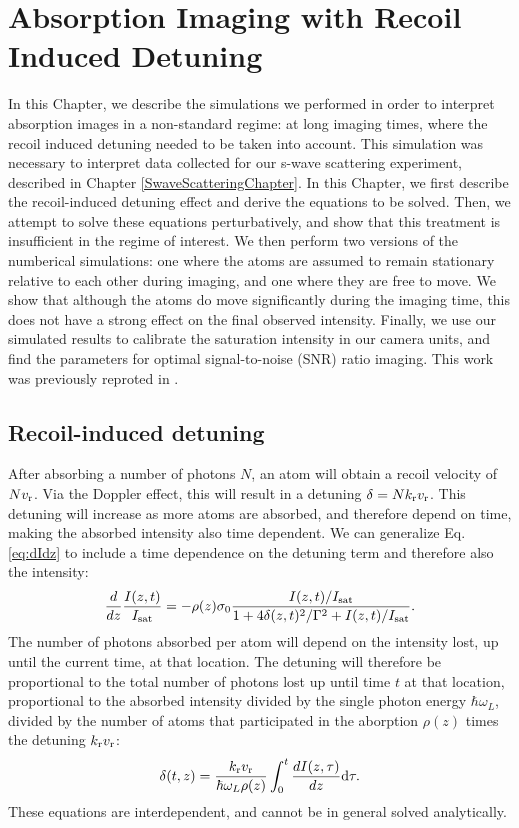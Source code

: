 \renewcommand{\thechapter}{4}

\chapter{Absorption Imaging with Recoil Induced Detuning}\label{AbsorptionImagingChapter}

In this Chapter, we describe the simulations we performed in order to interpret absorption images in a non-standard regime: at long imaging times, where the recoil induced detuning needed to be taken into account. This simulation was necessary to interpret data collected for our s-wave scattering experiment, described in Chapter \ref{SwaveScatteringChapter}. In this Chapter, we first describe the recoil-induced detuning effect  and derive the equations to be solved. Then, we attempt to solve these equations perturbatively, and show that this treatment is insufficient in the regime of interest. We then perform two versions of the numberical simulations: one where the atoms are assumed to remain stationary relative to each other during imaging, and one where they are free to move. We show that although the atoms do move significantly during the imaging time, this does not have a strong effect on the final observed intensity. Finally, we use our simulated results to calibrate the saturation intensity in our camera units, and find the parameters for optimal signal-to-noise (SNR) ratio imaging. This work was previously reproted in \cite{Genkina2015}.


\section{Recoil-induced detuning}

After absorbing a number of photons $N$, an atom will obtain a recoil velocity of $N v_{\rm{r}}$. Via the Doppler effect, this will result in a detuning $\delta=N k_{\rm{r}} v_{\rm{r}}$. This detuning will increase as more atoms are absorbed, and therefore depend on time, making the absorbed intensity also time dependent. We can generalize Eq. \ref{eq:dIdz} to include a time dependence on the detuning term and therefore also the intensity: 
\begin{equation}
\frac{d}{dz}\frac{I(z,t)}{I_{\rm{sat}}}=-\rho(z)\sigma_0\frac{I(z,t)/I_{\rm{sat}}}{1+4\delta(z,t)^2 /\Gamma^2+I(z,t)/I_{\rm{sat}}}. \label{eq3}
\end{equation}
The number of photons absorbed per atom will depend on the intensity lost, up until the current time, at that location. The detuning will therefore be proportional to the total number of photons lost up until time $t$ at that location, proportional to the absorbed intensity divided by the single photon energy $\hbar\omega_L$, divided by the number of atoms that participated in the aborption $\rho(z)$ times the detuning $ k_{\rm{r}} v_{\rm{r}}$:
\begin{equation}
\delta(t,z)=\frac{ k_{\rm{r}} v_{\rm{r}}}{\hbar\omega_L\rho(z)}\int_0^t\frac{dI(z,\tau)}{dz}\mathrm{d}\tau.
\label{eq4}
\end{equation}
These equations are interdependent, and cannot be in general solved analytically. 

